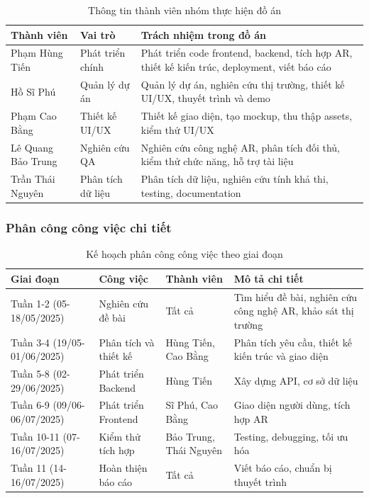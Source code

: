 \documentclass[12pt,a4paper]{article}
\begin{document}
\begin{table}[H]
\centering
\caption{Thông tin thành viên nhóm thực hiện đồ án}
\label{tab:team-members}
\begin{tabular}{@{}>{\raggedright\arraybackslash}p{3cm}>{\raggedright\arraybackslash}p{3cm}>{\raggedright\arraybackslash}p{6cm}@{}}
\toprule
\textbf{Thành viên} & \textbf{Vai trò} & \textbf{Trách nhiệm trong đồ án} \\
\midrule
Phạm Hùng Tiến & Phát triển chính & Phát triển code frontend, backend, tích hợp AR, thiết kế kiến trúc, deployment, viết báo cáo \\
Hồ Sĩ Phú & Quản lý dự án & Quản lý dự án, nghiên cứu thị trường, thiết kế UI/UX, thuyết trình và demo \\
Phạm Cao Bằng & Thiết kế UI/UX & Thiết kế giao diện, tạo mockup, thu thập assets, kiểm thử UI/UX \\
Lê Quang Bảo Trung & Nghiên cứu QA & Nghiên cứu công nghệ AR, phân tích đối thủ, kiểm thử chức năng, hỗ trợ tài liệu \\
Trần Thái Nguyên & Phân tích dữ liệu & Phân tích dữ liệu, nghiên cứu tính khả thi, testing, documentation \\
\bottomrule
\end{tabular}
\end{table}

\subsubsection{Phân công công việc chi tiết}

\begin{table}[H]
\centering
\caption{Kế hoạch phân công công việc theo giai đoạn}
\label{tab:work-allocation}
\begin{tabular}{@{}>{\raggedright\arraybackslash}p{2.5cm}>{\raggedright\arraybackslash}p{3cm}>{\raggedright\arraybackslash}p{2cm}>{\raggedright\arraybackslash}p{5cm}@{}}
\toprule
\textbf{Giai đoạn} & \textbf{Công việc} & \textbf{Thành viên} & \textbf{Mô tả chi tiết} \\
\midrule
Tuần 1-2 (05-18/05/2025) & Nghiên cứu đề bài & Tất cả & Tìm hiểu đề bài, nghiên cứu công nghệ AR, khảo sát thị trường \\
Tuần 3-4 (19/05-01/06/2025) & Phân tích và thiết kế & Hùng Tiến, Cao Bằng & Phân tích yêu cầu, thiết kế kiến trúc và giao diện \\
Tuần 5-8 (02-29/06/2025) & Phát triển Backend & Hùng Tiến & Xây dựng API, cơ sở dữ liệu \\
Tuần 6-9 (09/06-06/07/2025) & Phát triển Frontend & Sĩ Phú, Cao Bằng & Giao diện người dùng, tích hợp AR \\
Tuần 10-11 (07-16/07/2025) & Kiểm thử tích hợp & Bảo Trung, Thái Nguyên & Testing, debugging, tối ưu hóa \\
Tuần 11 (14-16/07/2025) & Hoàn thiện báo cáo & Tất cả & Viết báo cáo, chuẩn bị thuyết trình \\
\bottomrule
\end{tabular}
\end{table}
\end{document}
